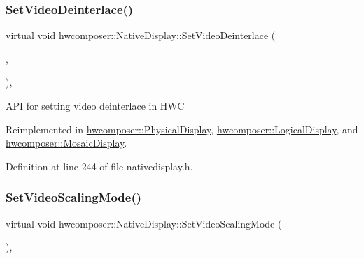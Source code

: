 \subsubsection{\texorpdfstring{Set\+Video\+Deinterlace()}{SetVideoDeinterlace()}}
{\footnotesize\ttfamily virtual void hwcomposer\+::\+Native\+Display\+::\+Set\+Video\+Deinterlace (\begin{DoxyParamCaption}\item[{H\+W\+C\+Deinterlace\+Flag}]{,  }\item[{H\+W\+C\+Deinterlace\+Control}]{ }\end{DoxyParamCaption})\hspace{0.3cm}{\ttfamily [inline]}, {\ttfamily [virtual]}}

A\+PI for setting video deinterlace in H\+WC 

Reimplemented in \mbox{\hyperlink{classhwcomposer_1_1PhysicalDisplay_a9e8d4b629a28d38bd51239b73b3cdd0c}{hwcomposer\+::\+Physical\+Display}}, \mbox{\hyperlink{classhwcomposer_1_1LogicalDisplay_a556ac92994853a0b0053132a3917bc75}{hwcomposer\+::\+Logical\+Display}}, and \mbox{\hyperlink{classhwcomposer_1_1MosaicDisplay_a28167d8f866c8b2c6ea01b42b442eb0f}{hwcomposer\+::\+Mosaic\+Display}}.



Definition at line 244 of file nativedisplay.\+h.


\begin{DoxyCode}{0}
\end{DoxyCode}
\mbox{\label{classhwcomposer_1_1NativeDisplay_ad35507d4c266627b1b20a0ebd116f907}} 
\subsubsection{\texorpdfstring{Set\+Video\+Scaling\+Mode()}{SetVideoScalingMode()}}
{\footnotesize\ttfamily virtual void hwcomposer\+::\+Native\+Display\+::\+Set\+Video\+Scaling\+Mode (\begin{DoxyParamCaption}\item[{uint32\+\_\+t}]{ }\end{DoxyParamCaption})\hspace{0.3cm}{\ttfamily [inline]}, {\ttfamily [virtual]}}


